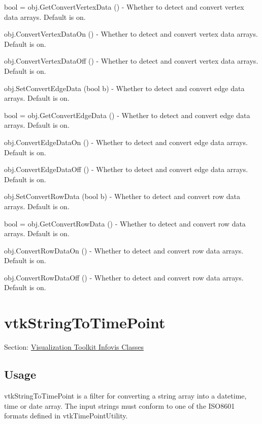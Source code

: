 \begin{DoxyItemize}
\item {\ttfamily bool = obj.\-Get\-Convert\-Vertex\-Data ()} -\/ Whether to detect and convert vertex data arrays. Default is on.  
\item {\ttfamily obj.\-Convert\-Vertex\-Data\-On ()} -\/ Whether to detect and convert vertex data arrays. Default is on.  
\item {\ttfamily obj.\-Convert\-Vertex\-Data\-Off ()} -\/ Whether to detect and convert vertex data arrays. Default is on.  
\item {\ttfamily obj.\-Set\-Convert\-Edge\-Data (bool b)} -\/ Whether to detect and convert edge data arrays. Default is on.  
\item {\ttfamily bool = obj.\-Get\-Convert\-Edge\-Data ()} -\/ Whether to detect and convert edge data arrays. Default is on.  
\item {\ttfamily obj.\-Convert\-Edge\-Data\-On ()} -\/ Whether to detect and convert edge data arrays. Default is on.  
\item {\ttfamily obj.\-Convert\-Edge\-Data\-Off ()} -\/ Whether to detect and convert edge data arrays. Default is on.  
\item {\ttfamily obj.\-Set\-Convert\-Row\-Data (bool b)} -\/ Whether to detect and convert row data arrays. Default is on.  
\item {\ttfamily bool = obj.\-Get\-Convert\-Row\-Data ()} -\/ Whether to detect and convert row data arrays. Default is on.  
\item {\ttfamily obj.\-Convert\-Row\-Data\-On ()} -\/ Whether to detect and convert row data arrays. Default is on.  
\item {\ttfamily obj.\-Convert\-Row\-Data\-Off ()} -\/ Whether to detect and convert row data arrays. Default is on.  
\end{DoxyItemize}\hypertarget{vtkinfovis_vtkstringtotimepoint}{}\section{vtk\-String\-To\-Time\-Point}\label{vtkinfovis_vtkstringtotimepoint}
Section\-: \hyperlink{sec_vtkinfovis}{Visualization Toolkit Infovis Classes} \hypertarget{vtkwidgets_vtkxyplotwidget_Usage}{}\subsection{Usage}\label{vtkwidgets_vtkxyplotwidget_Usage}
vtk\-String\-To\-Time\-Point is a filter for converting a string array into a datetime, time or date array. The input strings must conform to one of the I\-S\-O8601 formats defined in vtk\-Time\-Point\-Utility.

